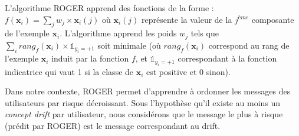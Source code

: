 L'algorithme ROGER apprend des fonctions de la forme : $f({\bm x_i}) = \sum_j w_j \times {\bm x_i}(j)$ où ${\bm x_i}(j)$ représente la valeur de la  $j^{ème}$ composante de l'exemple ${\bm x_i}$.
L'algorithme apprend les poids $w_j$ tels que $\sum_i rang_f({\bm x_i}) \times \mathds{1}_{y_i = +1}$ soit minimale (où $rang_f({\bm x_i})$ correspond au rang de l'exemple ${\bm x_i}$ induit par la fonction $f$, et $\mathds{1}_{y_i = +1}$ correspondant à la fonction indicatrice qui vaut 1 si la classe de ${\bm x_i}$ est positive et 0 sinon).


Dans notre contexte, ROGER permet d'apprendre à ordonner les messages des utilisateurs par risque décroissant.
Sous l'hypothèse qu'il existe au moins un \textit{concept drift} par utilisateur, nous considérons que le message le plus à risque (prédit par ROGER) est le message correspondant au drift.